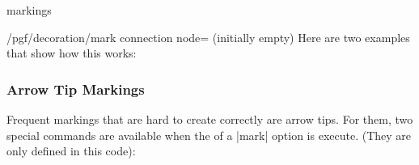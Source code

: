 \begin{decoration}{markings}
\begin{key}{/pgf/decoration/mark connection node= (initially empty)}
    Here are two examples that show how this works:
\begin{codeexample}[]
\end{codeexample}

\begin{codeexample}[]
\end{codeexample}

  \end{key}
\end{decoration}


\subsubsection{Arrow Tip Markings}

Frequent markings that are hard to create correctly are arrow
tips. For them, two special commands are available when the  of
a |mark| option is execute. (They are only defined in this code):

